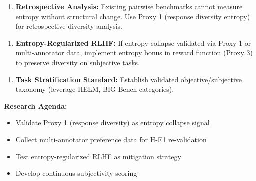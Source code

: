 \begin{enumerate}
\item \textbf{Retrospective Analysis:} Existing pairwise benchmarks cannot measure entropy without structural change. Use Proxy 1 (response diversity entropy) for retrospective diversity analysis.
\end{enumerate}

\begin{enumerate}
\item \textbf{Entropy-Regularized RLHF:} If entropy collapse validated via Proxy 1 or multi-annotator data, implement entropy bonus in reward function (Proxy 3) to preserve diversity on subjective tasks.
\end{enumerate}

\begin{enumerate}
\item \textbf{Task Stratification Standard:} Establish validated objective/subjective taxonomy (leverage HELM, BIG-Bench categories).
\end{enumerate}

\textbf{Research Agenda:}
\begin{itemize}
\item Validate Proxy 1 (response diversity) as entropy collapse signal
\item Collect multi-annotator preference data for H-E1 re-validation
\item Test entropy-regularized RLHF as mitigation strategy
\item Develop continuous subjectivity scoring
\end{itemize}

